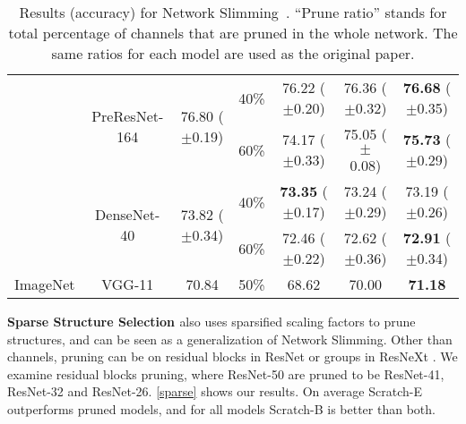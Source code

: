 \begin{table}[!htbp]
{\begin{tabular}{c|c|ccccc}
\multicolumn{1}{l|}{}                           & \multirow{2}{*}{PreResNet-164}  &      \multirow{2}{*}{76.80 ($\pm$0.19)}      &      40\%   &    76.22 ($\pm$0.20)      &  76.36 ($\pm$0.32)   &     \textbf{76.68} ($\pm$0.35)                  \\
\multicolumn{1}{l|}{}                           &        &      & 60\%                                &     74.17 ($\pm$0.33)     &             75.05 ($\pm$ 0.08)  &   \textbf{75.73} ($\pm$0.29)                                                \\ \cline{2-7} 
\multicolumn{1}{l|}{} & \multirow{2}{*}{DenseNet-40} &     \multirow{2}{*}{73.82 ($\pm$0.34)}   &   40\%  &   \textbf{73.35} ($\pm$0.17)  & 73.24 ($\pm$0.29)  & 73.19 ($\pm$0.26)      \\
\multicolumn{1}{l|}{} &   &   & \multicolumn{1}{c}{60\%} & \multicolumn{1}{c}{72.46 ($\pm$0.22)} & \multicolumn{1}{c}{72.62 ($\pm$0.36)} &  \textbf{72.91} ($\pm$0.34)        \\ \hline
ImageNet     & VGG-11   & \multicolumn{1}{c}{70.84}   & \multicolumn{1}{c}{50\%}   & \multicolumn{1}{c}{68.62}   & \multicolumn{1}{c}{70.00}  & \textbf{71.18} \\ \hline
\end{tabular}
}
\vspace{2ex}
\caption{Results (accuracy) for Network Slimming~\citep{liu2017learning}. ``Prune ratio'' stands for total percentage of channels that are pruned in the whole network. The same ratios for each model are used as the original paper. 
}
\label{network-slimming}
\vspace{-3ex}
\end{table}

\textbf{Sparse Structure Selection \citep{huang2018data}} also uses sparsified scaling factors to prune structures, and can be seen as a generalization of Network Slimming. Other than channels, pruning can be on residual blocks in ResNet or groups in ResNeXt \citep{xie2017aggregated}. We examine residual blocks pruning, where ResNet-50 are pruned to be ResNet-41, ResNet-32 and ResNet-26. \autoref{sparse} shows our results. On average Scratch-E outperforms pruned models, and for all models Scratch-B is better than both.

